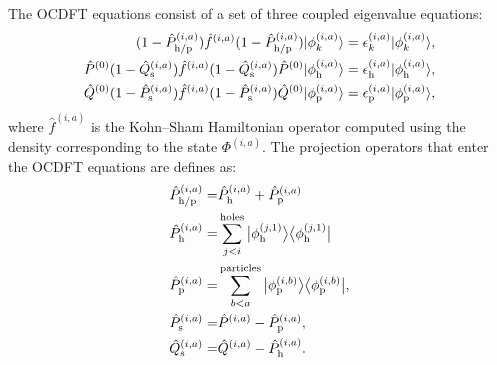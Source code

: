 \documentclass{article}
\begin{document}
The OCDFT equations consist of a set of three coupled eigenvalue equations:
\begin{equation}
\begin{split}
\label{eq:one_state_occ_eq_gen}
(1 - \hat{P}^{(i,a)}_{\rm h/p})\hat{f}^{(i,a)} (1 - \hat{P}^{(i,a)}_{\rm h/p})|\phi_k^{(i,a)}\rangle = \epsilon^{(i,a)}_k |\phi_k^{(i,a)}\rangle,\\
\hat{P}^{(0)}(1-\hat{Q}_{\rm s}^{(i,a)}) \hat{f}^{(i,a)} (1-\hat{Q}_{\rm s}^{(i,a)})\hat{P}^{(0)} |\phi_{\rm h}^{(i,a)}\rangle = \epsilon^{(i,a)}_{\rm h} |\phi_{\rm h}^{(i,a)}\rangle,\\
\hat{Q}^{(0)}(1-\hat{P}_{\rm s}^{(i,a)}) \hat{f}^{(i,a)} (1-\hat{P}_{\rm s}^{(i,a)}) \hat{Q}^{(0)}|\phi_{\rm p}^{(i,a)}\rangle = \epsilon^{(i,a)}_{\rm p} |\phi_{\rm p}^{(i,a)}\rangle,
\end{split}
\end{equation}
where $\hat{f}^{(i,a)} $ is the Kohn--Sham Hamiltonian operator computed using the density corresponding to the state $\Phi^{(i,a)}$.  The projection operators that enter the OCDFT equations are defines as:
\begin{align}
\hat{P}^{(i,a)}_{\rm h/p} =& \hat{P}^{(i,a)}_{\rm h} + \hat{P}^{(i,a)}_{\rm p} \\
\hat{P}^{(i,a)}_{\rm h} =&  \sum_{j < i}^{\rm holes}  \ket[1]{\phi^{(j,1)}_{\rm h}}\bra[1]{\phi^{(j,1)}_{\rm h}} \\
\hat{P}^{(i,a)}_{\rm p} =& \sum_{b < a}^{\rm particles}\ket[1]{\phi^{(i,b)}_{\rm p}}\bra[1]{\phi^{(i,b)}_{\rm p}},\\
\hat{P}^{(i,a)}_{\rm s} =& \hat{P}^{(i,a)} - \hat{P}^{(i,a)}_{\rm p},\\
\hat{Q}^{(i,a)}_{\rm s} =& \hat{Q}^{(i,a)} - \hat{P}^{(i,a)}_{\rm h}.
\end{align}

%
%

{\footnotesize 

}
\end{document}
